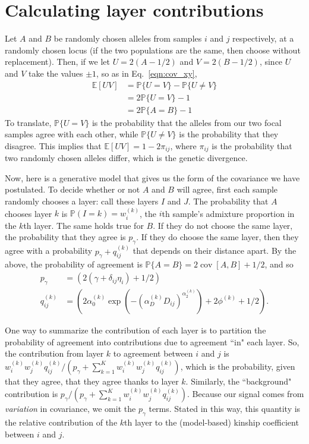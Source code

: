 \documentclass[10pt,letterpaper]{article}
\renewcommand{\P}{\mathbb{P}}
\newcommand{\E}{\mathbb{E}}
\newcommand{\cov}{\mathop{\mbox{cov}}}
\begin{document}
\section*{Calculating layer contributions}\label{layer_contribution}

Let $A$ and $B$ be randomly chosen alleles from samples $i$ and $j$ respectively,
at a randomly chosen locus 
(if the two populations are the same, then choose without replacement).
Then, if we let $U=2(A-1/2)$ and $V=2(B-1/2)$,
since $U$ and $V$ take the values $\pm 1$,
so as in Eq.\ \eqref{eqn:cov_xy},
$$\begin{aligned}
\E[UV]
        &= \P\{ U=V \} - \P\{ U \neq V \} \\
        &= 2 \P\{ U=V \} - 1 \\
        &= 2 \P\{ A=B \} - 1 
\end{aligned}$$
To translate, $\P\{ U=V \}$ is the probability that the alleles from our two focal samples agree with each other,
while $\P\{ U \neq V \}$ is the probability that they disagree.
This implies that $\E[UV] = 1 - 2 \pi_{ij}$, 
where $\pi_{ij}$ is the probability that two randomly chosen alleles differ, 
which is the genetic divergence.

Now, here is a generative model that gives us the form of the covariance we have postulated.
To decide whether or not $A$ and $B$ will agree,
first each sample randomly chooses a layer: call these layers $I$ and $J$.
The probability that $A$ chooses layer $k$ is $\P({I=k})=w_i^{(k)}$, 
the $i$th sample's admixture proportion in the $k$th layer.
The same holds true for $B$.
If they do not choose the same layer, the probability that they agree is $p_\gamma$.
If they do choose the same layer, 
then they agree with a probability $p_\gamma + q^{(k)}_{ij}$ that depends on their distance apart.
By the above,
the probability of agreement is $\P\{A=B\} = 2 \cov[A,B] + 1/2$,
and so
$$\begin{aligned}
    p_\gamma &= (2 (\gamma + \delta_{ij} \eta_i) + 1/2) \\
    q^{(k)}_{ij} &= \left(2 \alpha_0^{(k)} \exp\left( - \left(\alpha_D^{(k)} D_{ij}\right)^{\alpha_2^{(k)}} \right) + 2 \phi^{(k)}  + 1/2 \right) .
\end{aligned}$$

One way to summarize the contribution of each layer is to partition the probability of agreement
into contributions due to agreement ``in" each layer.
So, the contribution from layer $k$ to agreement between $i$ and $j$ is 
$w_i^{(k)} w_j^{(k)} q^{(k)}_{ij} / (p_\gamma + \sum_{k=1}^K w_i^{(k)} w_j^{(k)} q^{(k)}_{ij})$,
which is the probability, given that they agree, that they agree thanks to layer $k$.
Similarly, the ``background" contribution is $p_\gamma / (p_\gamma + \sum_{k=1}^K w_i^{(k)} w_j^{(k)} q^{(k)}_{ij})$.
Because our signal comes from \emph{variation} in covariance, we omit
the $p_\gamma$ terms. 
Stated in this way, this quantity is the
relative contribution of the $k$th layer to the (model-based) kinship
coefficient between $i$ and $j$.
\end{document}
